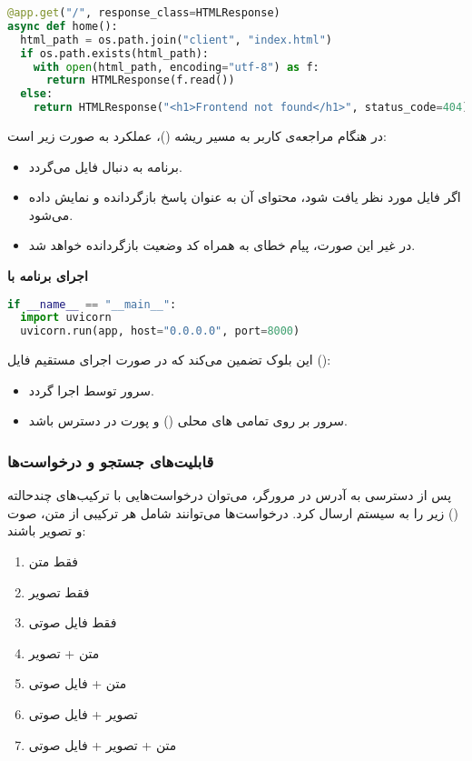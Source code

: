 \documentclass{article}
\begin{document}
\begin{latin}
\begin{lstlisting}[language=Python]
@app.get("/", response_class=HTMLResponse)
async def home():
  html_path = os.path.join("client", "index.html")
  if os.path.exists(html_path):
    with open(html_path, encoding="utf-8") as f:
      return HTMLResponse(f.read())
  else:
    return HTMLResponse("<h1>Frontend not found</h1>", status_code=404)
\end{lstlisting}
\end{latin}
در هنگام مراجعه‌ی کاربر به مسیر ریشه (\lr{/})، عملکرد به صورت زیر است:
\begin{itemize}
    \item برنامه به دنبال فایل  می‌گردد.
    \item اگر فایل مورد نظر یافت شود، محتوای آن به عنوان پاسخ  بازگردانده و نمایش داده می‌شود.
    \item در غیر این صورت، پیام خطای  به همراه کد وضعیت  بازگردانده خواهد شد.
\end{itemize}

\textbf{اجرای برنامه با }

\begin{latin}
\begin{lstlisting}[language=Python]
if __name__ == "__main__":
  import uvicorn
  uvicorn.run(app, host="0.0.0.0", port=8000)
\end{lstlisting}
\end{latin}
این بلوک تضمین می‌کند که در صورت اجرای مستقیم فایل ():
\begin{itemize}
    \item سرور  توسط  اجرا گردد.
    \item سرور بر روی تمامی های محلی () و پورت  در دسترس باشد. 
\end{itemize}

\subsubsection{قابلیت‌های جستجو و درخواست‌ها}

پس از دسترسی به آدرس  در مرورگر، می‌توان درخواست‌هایی با ترکیب‌های چندحالته () زیر را به سیستم ارسال کرد. درخواست‌ها می‌توانند شامل هر ترکیبی از متن، صوت و تصویر باشند:

\begin{enumerate}
    \item فقط متن
    \item فقط تصویر
    \item فقط فایل صوتی
    \item متن + تصویر
    \item متن + فایل صوتی
    \item تصویر + فایل صوتی
    \item متن + تصویر + فایل صوتی
\end{enumerate}
\end{document}
